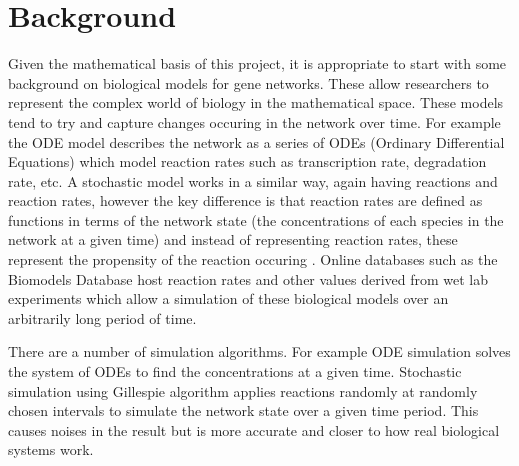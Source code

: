 \documentclass{article}
\begin{document}
	
	
	\section{Background}
	
	
	\par Given the mathematical basis of this project, it is appropriate to start with some background on biological models for gene networks. These allow researchers to represent the complex world of biology in the mathematical space. These models tend to try and capture changes occuring in the network over time. For example the ODE model describes the network as a series of ODEs (Ordinary Differential Equations) which model reaction rates such as transcription rate, degradation rate, etc\cite{sim_tutorial}. A stochastic model works in a similar way, again having reactions and reaction rates, however the key difference is that reaction rates are defined as functions in terms of the network state (the concentrations of each species in the network at a given time) and instead of representing reaction rates, these represent the propensity of the reaction occuring \cite{sim_tutorial}. Online databases such as the Biomodels Database \cite{biomodels} host reaction rates and other values derived from wet lab experiments which allow a simulation of these biological models over an arbitrarily long period of time.
	
	\par There are a number of simulation algorithms. For example ODE simulation solves the system of ODEs to find the concentrations at a given time. Stochastic simulation using Gillespie algorithm\cite{gillespie_original} applies reactions randomly at randomly chosen intervals to simulate the network state over a given time period. This causes noises in the result but is more accurate and closer to how real biological systems work.
	
\end{document}
